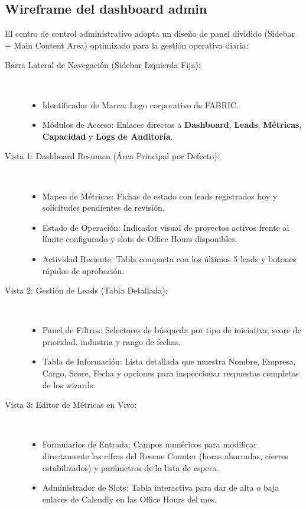 \documentclass[11pt,letterpaper]{article}
\begin{document}
\subsection{Wireframe del dashboard admin}

El centro de control administrativo adopta un diseño de panel dividido (Sidebar + Main Content Area) optimizado para la gestión operativa diaria:

\begin{description}
\item[Barra Lateral de Navegación (Sidebar Izquierda Fija):] \ 
  \begin{itemize}
  \item Identificador de Marca: Logo corporativo de FABRIC.
  \item Módulos de Acceso: Enlaces directos a \textbf{Dashboard}, \textbf{Leads}, \textbf{Métricas}, \textbf{Capacidad} y \textbf{Logs de Auditoría}.
  \end{itemize}

\item[Vista 1: Dashboard Resumen (Área Principal por Defecto):] \ 
  \begin{itemize}
  \item Mapeo de Métricas: Fichas de estado con leads registrados hoy y solicitudes pendientes de revisión.
  \item Estado de Operación: Indicador visual de proyectos activos frente al límite configurado y slots de Office Hours disponibles.
  \item Actividad Reciente: Tabla compacta con los últimos 5 leads y botones rápidos de aprobación.
  \end{itemize}

\item[Vista 2: Gestión de Leads (Tabla Detallada):] \ 
  \begin{itemize}
  \item Panel de Filtros: Selectores de búsqueda por tipo de iniciativa, score de prioridad, industria y rango de fechas.
  \item Tabla de Información: Lista detallada que muestra Nombre, Empresa, Cargo, Score, Fecha y opciones para inspeccionar respuestas completas de los wizards.
  \end{itemize}

\item[Vista 3: Editor de Métricas en Vivo:] \ 
  \begin{itemize}
  \item Formularios de Entrada: Campos numéricos para modificar directamente las cifras del Rescue Counter (horas ahorradas, cierres estabilizados) y parámetros de la lista de espera.
  \item Administrador de Slots: Tabla interactiva para dar de alta o baja enlaces de Calendly en las Office Hours del mes.
  \end{itemize}


\end{description}
\end{document}
